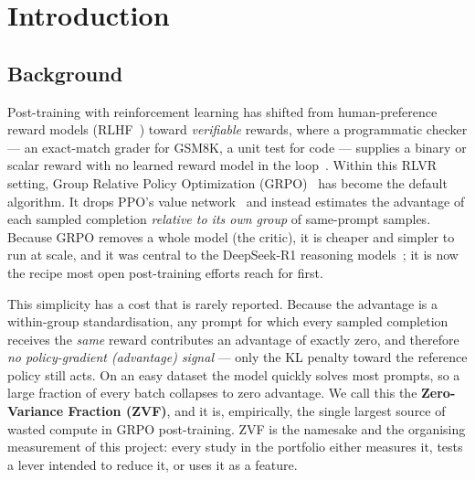 \documentclass[12pt,a4paper]{report}
\begin{document}
\clearpage
\tableofcontents
\clearpage
\listoffigures
\clearpage
\listoftables

\clearpage
{}
\setcounter{page}{1}

\chapter{Introduction}
\label{ch:intro}

\section{Background}
Post-training with reinforcement learning has shifted from human-preference reward
models (RLHF~\cite{ouyang2022instructgpt}) toward \emph{verifiable} rewards, where
a programmatic checker --- an exact-match grader for GSM8K, a unit test for code
--- supplies a binary or scalar reward with no learned reward model in the
loop~\cite{lambert2024tulu3,guo2025r1}. Within this RLVR setting, Group Relative
Policy Optimization (GRPO)~\cite{shao2024deepseekmath} has become the default
algorithm. It drops PPO's value network~\cite{schulman2017ppo} and instead
estimates the advantage of each sampled completion \emph{relative to its own group}
of same-prompt samples. Because GRPO removes a whole model (the critic), it is
cheaper and simpler to run at scale, and it was central to the DeepSeek-R1
reasoning models~\cite{guo2025r1}; it is now the recipe most open post-training
efforts reach for first.

This simplicity has a cost that is rarely reported. Because the advantage is a
within-group standardisation, any prompt for which every sampled completion
receives the \emph{same} reward contributes an advantage of exactly zero, and
therefore \emph{no policy-gradient (advantage) signal} --- only the KL penalty
toward the reference policy still acts. On an easy dataset the model quickly solves most
prompts, so a large fraction of every batch collapses to zero advantage. We call
this the \textbf{Zero-Variance Fraction (ZVF)}, and it is, empirically, the single
largest source of wasted compute in GRPO post-training. ZVF is the namesake and the
organising measurement of this project: every study in the portfolio either
measures it, tests a lever intended to reduce it, or uses it as a feature.
\end{document}
